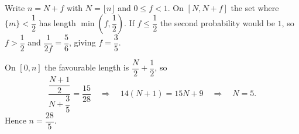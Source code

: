 Write $n=N+f$ with $N=\lfloor n\rfloor$ and $0\le f<1$. On $[N,N+f]$ the set where $\{m\}<\dfrac12$ has length $\min\left(f,\dfrac12\right)$. If $f\le\dfrac12$ the second probability would be $1$, so $f>\dfrac12$ and $\dfrac{1}{2f}=\dfrac56$, giving $f=\dfrac35$.

On $[0,n]$ the favourable length is $\dfrac N2+\dfrac12$, so
\[\dfrac{\dfrac{N+1}{2}}{N+\dfrac35}=\dfrac{15}{28}\quad\Longrightarrow\quad14(N+1)=15N+9\quad\Longrightarrow\quad N=5.\]
Hence $n=\boxed{\dfrac{28}{5}}$.
